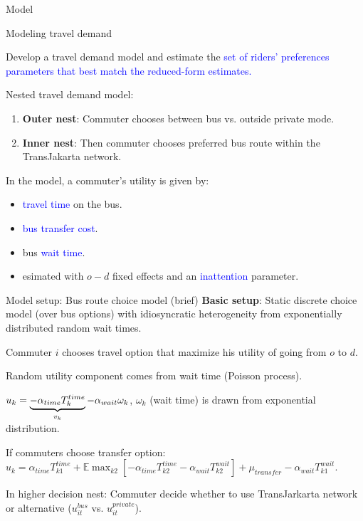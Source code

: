 \documentclass[notes,11pt, aspectratio=169]{beamer}
\newenvironment{wideitemize}{\itemize\addtolength{\itemsep}{0.4em}}{\enditemize}
\begin{document}
\begin{frame}
	\centering
	\Huge{Model}
\end{frame}

\begin{frame}{Modeling travel demand}
\begin{wideitemize}
\item Develop a travel demand model and estimate the \textcolor{blue}{set of riders' preferences parameters that best match the reduced-form estimates.}
	\item Nested travel demand model:	
	\begin{enumerate}
		\item \textbf{Outer nest}: Commuter chooses between bus vs. outside private mode.
		\item \textbf{Inner nest}: Then commuter chooses preferred bus route within the TransJakarta network. 
	\end{enumerate}	
\item In the model, a commuter's utility is given by:
	\begin{itemize}
		\item \textcolor{blue}{travel time} on the bus.
		\item \textcolor{blue}{bus transfer cost}.
		\item bus \textcolor{blue}{wait time}.
		\item esimated with $o-d$ fixed effects and an \textcolor{blue}{inattention} parameter.
	\end{itemize}
\end{wideitemize}



\end{frame}

\begin{frame}{Model setup: Bus route choice model (brief)}
	\textbf{Basic setup}: Static discrete choice model (over bus options) with idiosyncratic heterogeneity from exponentially distributed random wait times.	
	\begin{wideitemize}
	\item Commuter $i$ chooses travel option that maximize his utility of going from $o$ to $d$.
	\item Random utility component comes from wait time (Poisson process).
	\item[] $u_k = \underbrace{-\alpha_{time}T_k^{time}}_{\hidewidth v_k \hidewidth} - \alpha_{wait} \omega_k$, $\omega_k$ (wait time) is drawn from exponential distribution.
	\item If commuters choose transfer option:\\
	$u_k = \alpha_{time} T_{k1}^{time} + \mathbb{E}\max_{k2} \left[ -\alpha_{time} T_{k2}^{time} - \alpha_{wait} T_{k2}^{wait} \right] + \mu_{transfer} - \alpha_{wait} T_{k1}^{wait}.$
\item In higher decision nest: Commuter decide whether to use TransJarkarta network or alternative ($u_{it}^{bus}$ vs. $u_{it}^{private}$).
	\end{wideitemize}
\end{frame}
\end{document}
